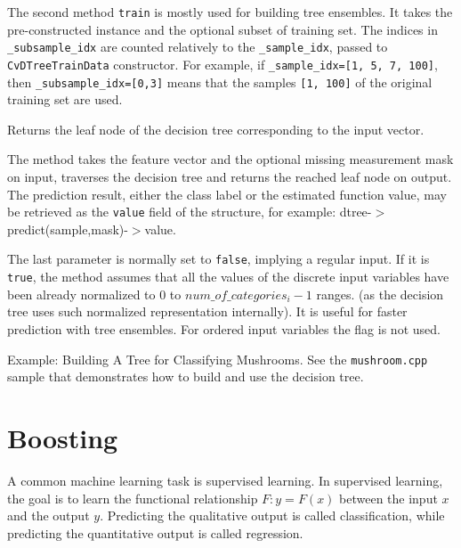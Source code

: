 The second method \texttt{train} is mostly used for building tree ensembles. It takes the pre-constructed  instance and the optional subset of training set. The indices in \texttt{\_subsample\_idx} are counted relatively to the \texttt{\_sample\_idx}, passed to \texttt{CvDTreeTrainData} constructor. For example, if \texttt{\_sample\_idx=[1, 5, 7, 100]}, then \texttt{\_subsample\_idx=[0,3]} means that the samples \texttt{[1, 100]} of the original training set are used.


Returns the leaf node of the decision tree corresponding to the input vector.


The method takes the feature vector and the optional missing measurement mask on input, traverses the decision tree and returns the reached leaf node on output. The prediction result, either the class label or the estimated function value, may be retrieved as the \texttt{value} field of the  structure, for example: dtree-$>$predict(sample,mask)-$>$value.

The last parameter is normally set to \texttt{false}, implying a regular
input. If it is \texttt{true}, the method assumes that all the values of
the discrete input variables have been already normalized to $0$
to $num\_of\_categories_i-1$ ranges. (as the decision tree uses such
normalized representation internally). It is useful for faster prediction
with tree ensembles. For ordered input variables the flag is not used.

Example: Building A Tree for Classifying Mushrooms.  See the
\texttt{mushroom.cpp} sample that demonstrates how to build and use the
decision tree.

\section{Boosting} %

A common machine learning task is supervised learning. In supervised learning, the goal is to learn the functional relationship $F: y = F(x)$ between the input $x$ and the output $y$. Predicting the qualitative output is called classification, while predicting the quantitative output is called regression.

